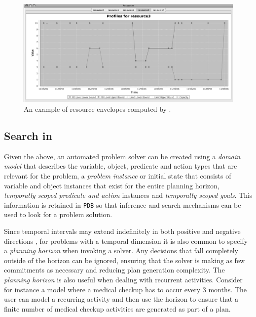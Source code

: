 \begin{figure}
\centering
\includegraphics[scale=0.2]{figs/europa-resource-envelopes.png}
\caption{\small An example of resource envelopes \cite{Muscettola04,Muscettola06} computed by \eue.}
\label{fig:resenvelopes}
\end{figure}


\subsection{Search in \eu}
\label{sec:europa:search}

Given the above, an automated problem solver can be created using a
\emph{domain model} that describes the variable, object, predicate and
action types that are relevant for the problem, a \emph{problem
  instance} or initial state that consists of variable and object
instances that exist for the entire planning horizon, \emph{temporally
  scoped predicate and action} instances and \emph{temporally scoped
  goals}. This information is retained in \eus \texttt{PDB} so that
inference and search mechanisms can be used to look for a problem
solution.

Since temporal intervals may extend indefinitely in both positive and
negative directions \kcomment{(\eg $[-\infty,+\infty]$)}, for problems
with a temporal dimension it is also common to specify a
\emph{planning horizon} when invoking a solver. Any decisions that
fall completely outside of the horizon can be ignored, ensuring that
the solver is making as few commitments as necessary and reducing plan
generation complexity.  The \emph{planning horizon} is also useful
when dealing with recurrent activities. Consider for instance a model
where a medical checkup has to occur every $3$ months. The user can
model a recurring activity and then use the horizon to ensure that a
finite number of medical checkup activities are generated as part of a
plan.

